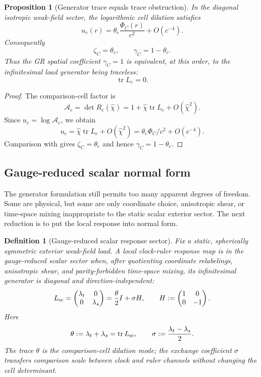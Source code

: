 \documentclass[11pt]{article}
\newtheorem{proposition}[theorem]{Proposition}
\newtheorem{definition}[theorem]{Definition}
\theoremstyle{remark}
\begin{document}
\begin{proposition}[Generator trace equals trace obstruction]
\label{prop:generator-trace-obstruction}
In the diagonal isotropic weak-field sector, the logarithmic cell dilation satisfies
\[
        u_e(r)=\theta_e\frac{\Phi_C(r)}{c^2}+O(c^{-4}).
\]
Consequently
\[
        \zeta_C=\theta_e,
        \qquad
        \gamma_C=1-\theta_e.
\]
Thus the GR spatial coefficient \(\gamma_C=1\) is equivalent, at this order, to the infinitesimal load generator being traceless:
\[
        \operatorname{tr}L_e=0.
\]
\end{proposition}

\begin{proof}
The comparison-cell factor is
\[
        \mathcal A_e=\det R_e(\hat\chi)
        =1+\hat\chi\operatorname{tr}L_e+O(\hat\chi^2).
\]
Since \(u_e=\log\mathcal A_e\), we obtain
\[
        u_e=\hat\chi\operatorname{tr}L_e+O(\hat\chi^2)
        =\theta_e\Phi_C/c^2+O(c^{-4}).
\]
Comparison with  gives \(\zeta_C=\theta_e\) and hence \(\gamma_C=1-\theta_e\).
\end{proof}


\subsection{Gauge-reduced scalar normal form}

The generator formulation still permits too many apparent degrees of freedom.  Some are physical, but some are only coordinate choice, anisotropic shear, or time-space mixing inappropriate to the static scalar exterior sector.  The next reduction is to put the local response into normal form.

\begin{definition}[Gauge-reduced scalar response sector]
\label{def:gauge-reduced-scalar-sector}
Fix a static, spherically symmetric exterior weak-field load.  A local clock-ruler response map is in the gauge-reduced scalar sector when, after quotienting coordinate relabelings, anisotropic shear, and parity-forbidden time-space mixing, its infinitesimal generator is diagonal and direction-independent:
\[
        L_{\rm sc}
        =
        \begin{pmatrix}
        \lambda_t & 0\\
        0 & \lambda_s
        \end{pmatrix}
        =\frac{\theta}{2}I+\sigma H,
        \qquad
        H:=
        \begin{pmatrix}
        1&0\\
        0&-1
        \end{pmatrix}.
\]
Here
\[
        \theta:=\lambda_t+\lambda_s=\operatorname{tr}L_{\rm sc},
        \qquad
        \sigma:=\frac{\lambda_t-\lambda_s}{2}.
\]
The trace \(\theta\) is the comparison-cell dilation mode; the exchange coefficient \(\sigma\) transfers comparison scale between clock and ruler channels without changing the cell determinant.
\end{definition}
\end{document}
